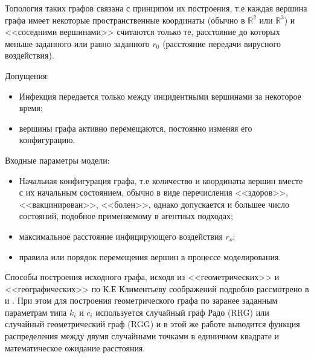 Топология таких графов связана с принципом их построения, т.е каждая вершина графа имеет некоторые пространственные координаты (обычно в $\mathbb{R}^2$ или $\mathbb{R}^3$) и <<соседними вершинами>> считаются только те, расстояние до которых  меньше заданного или равно заданного $r_0$ (расстояние передачи вирусного воздействия). 

Допущения:
\begin{itemize}
	\item Инфекция передается только между инцидентными вершинами за некоторое время;
	\item вершины графа активно перемещаются, постоянно изменяя его конфигурацию.
\end{itemize}
Входные параметры модели:
\begin{itemize}
	\item Начальная конфигурация графа, т.е количество и координаты вершин вместе с их начальным состоянием, обычно в виде перечисления 	<<здоров>>, <<вакцинирован>>, <<болен>>, однако допускается и большее число состояний, подобное применяемому в агентных подходах;
	\item максимальное расстояние инфицирующего воздействия $r_o$;
	\item правила или порядок перемещения вершин в процессе моделирования.
\end{itemize}

Способы построения исходного графа, исходя из <<геометрических>>  и <<географических>> по К.Е Климентьеву соображений подробно рассмотрено в %
и %
. При этом для построения геометрического графа по заранее заданным параметрам типа $k_i$ и $c_i$ используется случайный граф Радо (RRG) или случайный геометрический граф (RGG) и в этой же работе %
выводится функция распределения  между двумя случайными точками в единичном квадрате и математическое ожидание расстояния.


